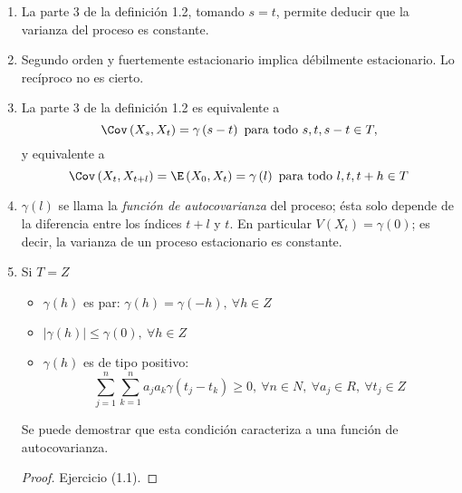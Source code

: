 \begin{observacion}
\begin{enumerate}
\item La parte 3 de la definici\'{o}n 1.2, tomando $s=t$, permite deducir que la varianza del proceso es constante.
\item Segundo orden y fuertemente estacionario implica d\'{e}bilmente estacionario. Lo rec\'{i}proco no es cierto.
\item La parte 3 de la definici\'{o}n 1.2 es equivalente a
\[ 
\Cov\left( X_{s},X_{t} \right)=\gamma \left( s-t \right)\text{ para todo } s,t,s-t\in T,
\]
y equivalente a
\[
\Cov\left( X_{t},X_{t+l} \right)=\E\left( X_{0},X_{t} \right)=\gamma \left( l 
\right)\text{ para todo }  l,t,t+h\in T
\]

\item $\gamma \left( l \right)$ se llama la \emph{funci\'{o}n de autocovarianza} del proceso; \'{e}sta solo depende de la diferencia entre los \'{i}ndices $t+l$ y $t$. En particular $V\left( X_{t} \right)=\gamma (0)$; es decir, la varianza de un proceso estacionario es constante.

\item Si $T=Z $
  \begin{itemize}
  \item $\gamma \left( h \right)$ es par: $\gamma \left( h \right)=\gamma \left( -h \right),\  \forall   h\in Z$
  \item $\left| \gamma \left( h \right) \right|\le \gamma \left( 0 \right),\  \forall h\in Z$ 
  \item $\gamma \left( h \right)$ es de tipo positivo:
  \[
    \sum_{j=1}^n \sum_{k=1}^n {a_{j}a_{k}\gamma \left( t_{j}-t_{k} 
    \right)} \geq 0,
    \ \forall n\in N,\ \forall a_{j}\in R,\ \forall t_{j}\in Z
  \]
  \end{itemize}
Se puede demostrar que esta condici\'{o}n caracteriza a una funci\'{o}n de autocovarianza.

\begin{proof}
 Ejercicio (1.1).\qedhere
\end{proof}
\end{enumerate}
\end{observacion}

